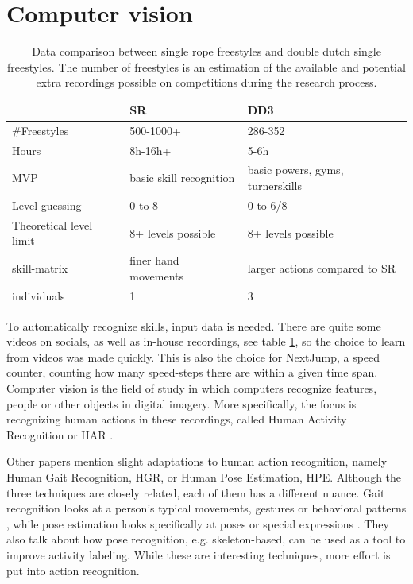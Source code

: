 \section{Computer vision}
\label{lit:computer-vision}

\begin{table}[t]
    \centering
    \begin{tabular}{|l|l|l|}
        \hline
        & SR & DD3 \\ \hline
        \#Freestyles & 500-1000+ & 286-352 \\ \hline
        Hours & 8h-16h+ & 5-6h \\ \hline
        MVP & basic skill recognition & basic powers, gyms, turnerskills \\ \hline
        Level-guessing & 0 to 8 & 0 to 6/8 \\ \hline
        Theoretical level limit & 8+ levels possible & 8+ levels possible \\ \hline
        skill-matrix & finer hand movements & larger actions compared to SR \\ \hline
        individuals & 1 & 3 \\ \hline
    \end{tabular}
    \caption[Collected videos data comparison]{Data comparison between single rope freestyles and double dutch single freestyles. The number of freestyles is an estimation of the available and potential extra recordings possible on competitions during the research process.}
    \label{tbl:data-comparison-sr-dd}
\end{table}

To automatically recognize skills, input data is needed. There are quite some videos on socials, as well as in-house recordings, see table \ref{tbl:data-comparison-sr-dd}, so the choice to learn from videos was made quickly. This is also the choice for NextJump, a speed counter, counting how many speed-steps there are within a given time span.
Computer vision is the field of study in which computers recognize features, people or other objects in digital imagery. More specifically, the focus is recognizing human actions in these recordings, called Human Activity Recognition or HAR \autocite{Pareek_2020}.


Other papers mention slight adaptations to human action recognition, namely Human Gait Recognition, HGR, or Human Pose Estimation, HPE. Although the three techniques are closely related, each of them has a different nuance. Gait recognition looks at a person's typical movements, gestures or behavioral patterns \autocite{Alharthi_2019}, while pose estimation looks specifically at poses or special expressions \autocite{Song_2021}. They also talk about how pose recognition, e.g. skeleton-based, can be used as a tool to improve activity labeling.
While these are interesting techniques, more effort is put into action recognition.





